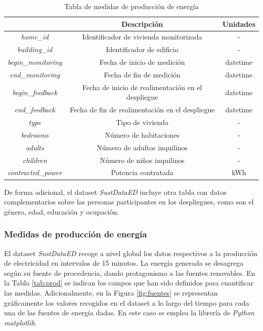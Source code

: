 \vspace{3mm}

\begin{table}[h!]
    \centering
    \begin{tabular}{|c|c|c|}
    \hline
    \rowcolor[HTML]{AAAAAA} 
    \multicolumn{1}{|c|}{\cellcolor[HTML]{AAAAAA}Campo} & \multicolumn{1}{c|}{\cellcolor[HTML]{AAAAAA}Descripción} & Unidades \\ \hline
    \textit{home\_id} & Identificador de vivienda monitorizada & - \\ \hline
    \textit{building\_id} & Identificador de edificio & - \\ \hline
    \textit{begin\_monitoring} & Fecha de inicio de medición & datetime \\ \hline
    \textit{end\_monitoring} & Fecha de fin de medición & datetime \\ \hline
    \textit{begin\_feedback} & Fecha de inicio de realimentación en el despliegue & datetime \\ \hline
    \textit{end\_feedback} & Fecha de fin de realimentación en el despliegue & datetime \\ \hline
    \textit{type} & Tipo de vivienda & - \\ \hline
    \textit{bedrooms} & Número de habitaciones & - \\ \hline
    \textit{adults} & Número de adultos inquilinos & - \\ \hline
    \textit{children} & Número de niños inquilinos & - \\ \hline
    \textit{contracted\_power} & Potencia contratada & kWh \\ \hline
    \end{tabular}
    \caption{Tabla de medidas de producción de energía \cite{sustdata}}
    \label{tab:demo}
\end{table}

De forma adicional, el dataset \textit{SustDataED} incluye otra tabla con datos complementarios sobre las personas participantes en los despliegues, como son el género, edad, educación y ocupación.

\subsubsection{Medidas de producción de energía}
\label{sec:prodsustdata}

El dataset \textit{SustDataED} recoge a nivel global los datos respectivos a la producción de electricidad en intervalos de 15 minutos. La energía generada se desagrega según su fuente de procedencia, dando protagonismo a las fuentes renovables. En la Tabla \ref{tab:prod} se indican los campos que han sido definidos para cuantificar las medidas. Adicionalmente, en la Figura \ref{fig:fuentes} se representan gráficamente los valores recogidos en el dataset a lo largo del tiempo para cada una de las fuentes de energía dadas. En este caso se emplea la librería de \textit{Python} \textit{matplotlib}.


